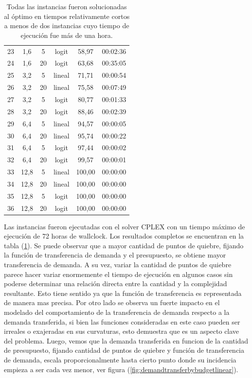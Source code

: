 \documentclass{article}
\begin{document}
\begin{table}
\begin{tabular}{cccccc}
        23 & 1,6 & 5 & logit & 58,97 & 00:02:36 \\
        24 & 1,6 & 20 & logit & 63,68 & 00:35:05 \\
        25 & 3,2 & 5 & lineal & 71,71 & 00:00:54 \\
        26 & 3,2 & 20 & lineal & 75,58 & 00:07:49 \\
        27 & 3,2 & 5 & logit & 80,77 & 00:01:33 \\
        28 & 3,2 & 20 & logit & 88,46 & 00:02:39 \\
        29 & 6,4 & 5 & lineal & 94,57 & 00:00:05 \\
        30 & 6,4 & 20 & lineal & 95,74 & 00:00:22 \\
        31 & 6,4 & 5 & logit & 97,44 & 00:00:02 \\
        32 & 6,4 & 20 & logit & 99,57 & 00:00:01 \\
        33 & 12,8 & 5 & lineal & 100,00 & 00:00:00 \\
        34 & 12,8 & 20 & lineal & 100,00 & 00:00:00 \\
        35 & 12,8 & 5 & logit & 100,00 & 00:00:00 \\
        36 & 12,8 & 20 & logit & 100,00 & 00:00:00 \\
        \bottomrule
    \end{tabular}
      \caption{Todas las instancias fueron solucionadas al óptimo en tiempos relativamente cortos a menos de dos instancias cuyo tiempo de ejecución fue más de una hora.} \label{table:sensibilityresults}
  \end{table}

  Las instancias fueron ejecutadas con el solver CPLEX con un tiempo máximo de ejecución de 72 horas de wallclock. Los resultados completos se encuentran en la tabla (\ref{table:sensibilityresults}). Se puede observar que a mayor cantidad de puntos de quiebre, fijando la función de transferencia de demanda y el presupuesto, se obtiene mayor transferencia de demanda. A su vez, variar la cantidad de puntos de quiebre parece hacer variar enormemente el tiempo de ejecución en algunos casos sin poderse determinar una relación directa entre la cantidad y la complejidad resultante. Esto tiene sentido ya que la función de transferencia es representada de manera mas precisa. Por otro lado se observa un fuerte impacto en el modelado del comportamiento de la transferencia de demanda respecto a la demanda transferida, si bien las funciones consideradas en este caso pueden ser irreales o exajeradas en sus curvaturas, esto demuestra que es un aspecto clave del problema. Luego, vemos que la demanda transferida en funcion de la cantidad de presupuesto, fijando cantidad de puntos de quiebre y función de transferencia de demanda, escala proporcionalmente hasta cierto punto donde su incidencia empieza a ser cada vez menor, ver figura (\ref{fig:demandtransferbybudgetlinear}).
\end{document}
